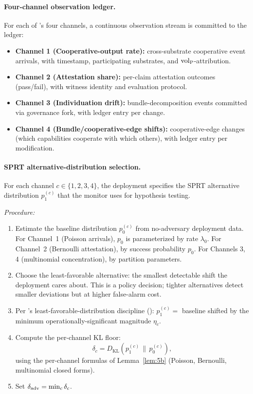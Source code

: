 \paragraph{Four-channel observation ledger.}

For each of \citep[Microfoundation]{lasser2026micro}'s four channels, a continuous observation stream
is committed to the ledger:
\begin{itemize}
\item \textbf{Channel 1 (Cooperative-output rate):} cross-substrate
  cooperative event arrivals, with timestamp, participating
  substrates, and ${\operatorname{vol}_{\mathrm{P}}}$-attribution.
\item \textbf{Channel 2 (Attestation share):} per-claim attestation
  outcomes (pass/fail), with witness identity and evaluation
  protocol.
\item \textbf{Channel 3 (Individuation drift):} bundle-decomposition
  events committed via governance fork, with ledger entry per change.
\item \textbf{Channel 4 (Bundle/cooperative-edge shifts):}
  cooperative-edge changes (which capabilities cooperate with which
  others), with ledger entry per modification.
\end{itemize}

\paragraph{SPRT alternative-distribution selection.}

For each channel $c \in \{1, 2, 3, 4\}$, the deployment specifies
the SPRT alternative distribution $p_1^{(c)}$ that the monitor uses
for hypothesis testing.

\emph{Procedure:}
\begin{enumerate}
\item Estimate the baseline distribution $p_0^{(c)}$ from
  no-adversary deployment data. For Channel~1 (Poisson arrivals),
  $p_0$ is parameterized by rate $\lambda_0$. For Channel~2
  (Bernoulli attestation), by success probability $p_0$. For
  Channels 3, 4 (multinomial concentration), by partition
  parameters.
\item Choose the least-favorable alternative: the smallest detectable
  shift the deployment cares about. This is a policy decision; tighter
  alternatives detect smaller deviations but at higher false-alarm
  cost.
\item Per \citep[Exogenous~Verification]{lasser2026exo}'s
    least-favorable-distribution discipline (\citep[\S Continuous Behavioral
    Monitoring]{lasser2026exo}): $p_1^{(c)} = $ baseline shifted by the
    minimum operationally-significant magnitude $\eta_c$.
\item Compute the per-channel KL floor:
  \[
    \delta_c = D_{\mathrm{KL}}(p_1^{(c)} \,\|\, p_0^{(c)}),
  \]
  using the per-channel formulas of Lemma~\ref{lem:5b} (Poisson,
  Bernoulli, multinomial closed forms).
\item Set $\delta_{\mathrm{adv}} = \min_c \delta_c$.
\end{enumerate}


